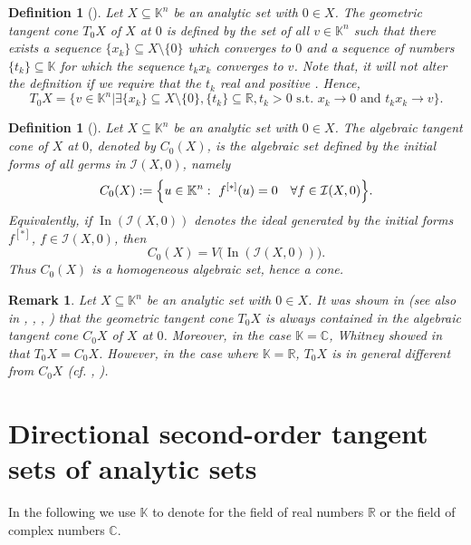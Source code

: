 \documentclass[10pt,reqno]{amsart}
\theoremstyle{break-italic}
\theoremstyle{break-italic}
\theoremstyle{break-italic}
\theoremstyle{break-italic}
\theoremstyle{break-italic}
\theoremstyle{break-italic}
\theoremstyle{break-italic}
\theoremstyle{break-italic}
\theoremstyle{break-roman}
\newtheorem{definition}[satz]{Definition}
\newtheorem{remark}[satz]{Remark}
\theoremstyle{standard}
\theoremstyle{varthm-roman}
\theoremstyle{varthm-italic}
\theoremstyle{varthm-roman-break}
\theoremstyle{varthm-italic-break}
\theoremstyle{varthm-roman-no-punctuation}
\theoremstyle{varthm-italic-no-punctuation}
\numberwithin{equation}{section}
\begin{document}
\begin{definition}[\cite{Wh65a, Wh65b, Chirka89}]\rm  Let $X\subseteq \mathbb K^n$ be an analytic set with $0\in X$.
The \textit{geometric tangent cone} $T_0 X$ of $X$ at $0$ is defined by the set of all $v \in \mathbb K^n$ such that there exists a sequence $\{x_k\} \subseteq X \setminus \{0\}$ which converges to $0$ and a sequence of numbers $\{t_k\} \subseteq \mathbb K$ for which the sequence $t_k x_k$ converges to $v$.
Note that, it will not alter the definition if we require that the $t_k$ real and positive \cite[Remark 8.2]{Wh65b}. Hence, 
\[
T_0 X = \{v \in \mathbb K^n \vert \exists \{x_k\} \subseteq X \setminus \{0\}, \{t_k\} \subseteq \mathbb R, t_k>0 \text{ s.t. } x_k \to 0 \text{ and } t_k x_k \to v\}.
\]

\end{definition}

\begin{definition}[\cite{Wh65a, Wh65b, Chirka89}] \rm
Let $X\subseteq \mathbb K^n$ be an analytic set with $0\in X$. The \emph{algebraic tangent cone} of $X$ at $0$, denoted by $C_0(X)$, is the algebraic set defined by the initial forms of all germs in $\mathcal{I}(X,0)$, namely
\[
C_0(X)
:=
\Bigl\{u\in \mathbb K^n:\ f^{[\ast]}(u)=0\quad \forall f\in \mathcal{I}(X,0)\Bigr\}.
\]
Equivalently, if $\operatorname{In}(\mathcal{I}(X,0))$ denotes the ideal generated by the initial forms $f^{[\ast]}$, $f\in \mathcal{I}(X,0)$, then
\[
C_0(X)=V\bigl(\operatorname{In}(\mathcal{I}(X,0))\bigr).
\]
Thus $C_0(X)$ is a homogeneous algebraic set, hence a cone. 
\end{definition}
\begin{remark} \rm 
  Let $X\subseteq \mathbb K^n$ be an analytic set with $0\in X$. It was shown in \cite{Wh65b} (see also in \cite{Chirka89}, \cite{GH}, \cite{LeLu20}, \cite{OW04}) that the geometric tangent cone  $T_0 X $ is always \textit{contained in} the  algebraic tangent cone $C_0 X $ of $X$ at $0$. Moreover, in the case $\mathbb K= \mathbb C$, Whitney showed in \cite{Wh65b} that $T_0 X = C_0 X$. However, in the case where $\mathbb K=\mathbb R$,  $T_0 X $ is in general   different from $C_0 X$ (cf. \cite{OW04}, \cite{LeLu20}). 
\end{remark}



\section{Directional second-order  tangent sets of analytic sets }\label{sec:geo-alg-tangents}
In the following we use $\mathbb K $ to  denote for the field of real numbers $\mathbb R$ or the field of complex numbers $\mathbb C$. 
\end{document}

